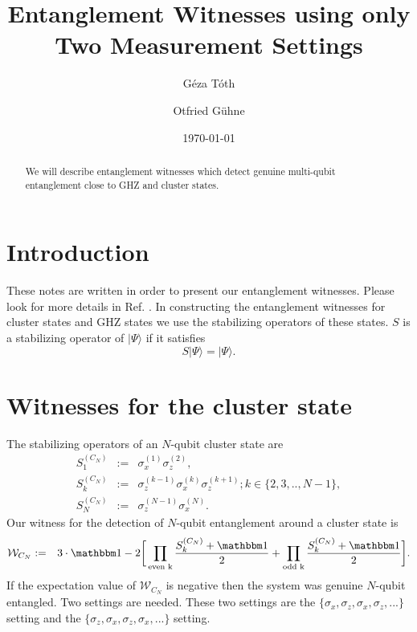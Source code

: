 \documentclass[amsmath,amssymb]{revtex4}
\newcommand{\be}{\begin{equation}}
\newcommand{\ee}{\end{equation}}
\newcommand{\eea}{\end{eqnarray}}
\newcommand{\bea}{\begin{eqnarray}}
\newcommand{\eins}{\ensuremath{\mathbbm 1}}
\newcommand{\WW}{\ensuremath{\mathcal{W}}}
\newcommand{\ket}[1]{\ensuremath{|#1\rangle}}
\begin{document}
\title{Entanglement Witnesses using only Two Measurement Settings}
\date{\today}
\begin{abstract}
We will describe entanglement witnesses which
detect genuine multi-qubit entanglement close to GHZ and cluster states.
\end{abstract}

\author{G\'eza T\'oth}


\author{Otfried G\"uhne}



\maketitle


\section{Introduction}

These notes are written in order to present our entanglement
witnesses. Please look for more details in Ref. \cite{PAPER}. In
constructing the entanglement witnesses for cluster states and GHZ
states we use the stabilizing operators of these states. $S$ is a
stabilizing operator of $\ket{\Psi}$ if it satisfies \be S
\ket{\Psi} = \ket{\Psi}. \label{stabil} \ee

\section{Witnesses for the cluster state}

The stabilizing operators of an $N$-qubit cluster state
are \bea S_1^{(C_N)}&:=&\sigma_x^{(1)}
\sigma_z^{(2)},
\nonumber\\
S_k^{(C_N)}&:=&\sigma_z^{(k-1)} \sigma_x^{(k)} \sigma_z^{(k+1)};
k\in\{2,3,..,N-1\},
\nonumber\\
S_N^{(C_N)}&:=&\sigma_z^{(N-1)} \sigma_x^{(N)}. \label{eigenC}
\eea Our witness for the detection of $N$-qubit entanglement
around a cluster state is \bea \WW_{C_N} &:=& 3\cdot\eins- 2
\bigg[\prod_{\text{even k}}\frac{S_k^{(C_N)}+\eins}{2}+
\prod_{\text{odd k}}\frac{S_k^{(C_N)}+\eins}{2}\bigg]. \label{CN}
\eea If the expectation value of $\WW_{C_N}$ is negative then the
system was genuine $N$-qubit entangled. Two settings are needed.
These two settings are  the
$\{\sigma_x,\sigma_z,\sigma_x,\sigma_z,...\}$ setting and the
$\{\sigma_z,\sigma_x,\sigma_z,\sigma_x,...\}$ setting.
\end{document}
